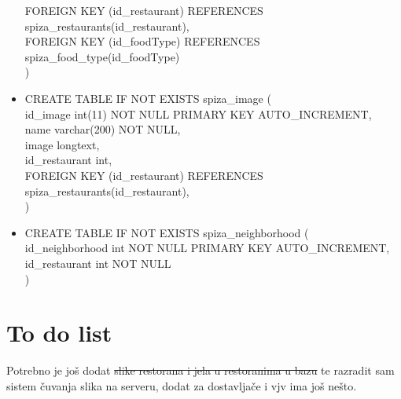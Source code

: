 \documentclass[12pt]{scrartcl}
\begin{document}
\begin{itemize}
    FOREIGN KEY (id\_restaurant) REFERENCES spiza\_restaurants(id\_restaurant),\\
    FOREIGN KEY (id\_foodType) REFERENCES spiza\_food\_type(id\_foodType)\\
    )
    \item[] CREATE TABLE IF NOT EXISTS spiza\_image (\\
    id\_image int(11) NOT NULL PRIMARY KEY AUTO\_INCREMENT,\\
    name varchar(200) NOT NULL,\\
    image longtext,\\
    id\_restaurant int,\\
    FOREIGN KEY (id\_restaurant) REFERENCES spiza\_restaurants(id\_restaurant),\\
    )
    \item[] CREATE TABLE IF NOT EXISTS spiza\_neighborhood (\\
    id\_neighborhood int NOT NULL PRIMARY KEY AUTO\_INCREMENT,\\
    id\_restaurant int NOT NULL\\
    )
\end{itemize}

\section{To do list}
Potrebno je još dodat \st{slike restorana i jela u restoranima u bazu} te razradit sam sistem čuvanja slika na serveru, dodat za dostavljače i vjv ima još nešto. 
\end{document}
